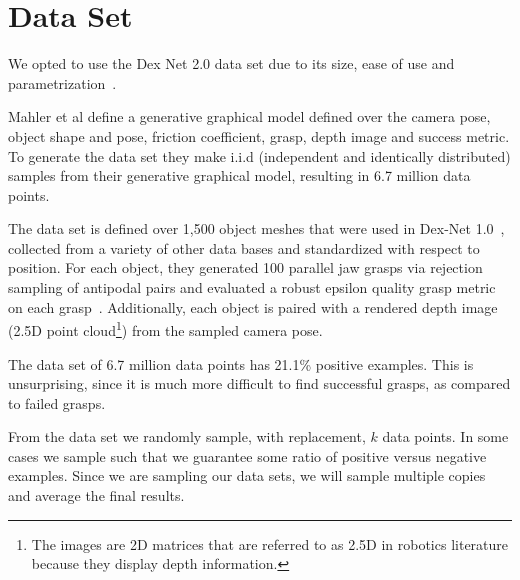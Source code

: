 
\section{Data Set}
\label{sec:data_set}

We opted to use the Dex Net 2.0 data set due to its size, ease of use and parametrization~\cite{mahler2017dex}. 

Mahler et al define a generative graphical model defined over the camera pose, object shape and pose, friction coefficient, grasp, depth image and success metric. 
To generate the data set they make i.i.d (independent and identically distributed) samples from their generative graphical model, resulting in 6.7 million data points. 

The data set is defined over 1,500 object meshes that were used in Dex-Net 1.0~\cite{mahler2016dex}, collected from a variety of other data bases and standardized with respect to position.
For each object, they generated 100 parallel jaw grasps via rejection sampling of antipodal pairs and evaluated a robust epsilon quality grasp metric on each grasp~\cite{seita2016large}. 
Additionally, each object is paired with a rendered depth image (2.5D point cloud\footnote{The images are 2D matrices that are referred to as 2.5D in robotics literature because they display depth information.}) from the sampled camera pose. 

The data set of 6.7 million data points has 21.1\% positive examples. 
This is unsurprising, since it is much more difficult to find successful grasps, as compared to failed grasps. 

From the data set we randomly sample, with replacement, $k$ data points. 
In some cases we sample such that we guarantee some ratio of positive versus negative examples. 
Since we are sampling our data sets, we will sample multiple copies and average the final results. 



